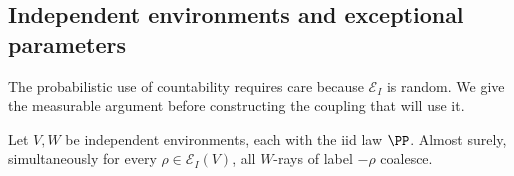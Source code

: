 \subsection{Independent environments and exceptional parameters}

The probabilistic use of countability requires care because
$\mathcal E_I$ is random.  We give the measurable argument before
constructing the coupling that will use it.

\begin{lemma}
\label{lem:independent-exceptional}
Let $V,W$ be independent environments, each with the iid law $\PP$.
Almost surely, simultaneously for every $\rho\in\mathcal E_I(V)$,
all $W$-rays of label $-\rho$ coalesce.
\end{lemma}

